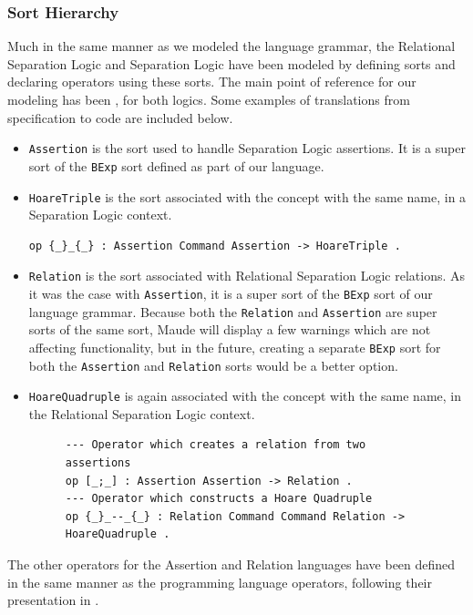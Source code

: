 \documentclass[12pt,a4paper]{article}
\begin{document}
{\subsubsection{Sort Hierarchy}
Much in the same manner as we modeled the language grammar, the Relational Separation Logic \cite{relational} and Separation Logic \cite{SeparationLogic} \cite{primer} have been modeled by defining sorts and declaring operators using these sorts. The main point of reference for our modeling has been \cite{relational}, for both logics. Some examples of translations from specification to code are included below.
\begin{itemize}
	\item \texttt{Assertion} is the sort used to handle Separation Logic assertions. It is a super sort of the \texttt{BExp} sort defined as part of our language.
	\item \texttt{HoareTriple} is the sort associated with the concept with the same name, in a Separation Logic context.
	\begin{lstlisting}[caption=Hoare Triple constructor operator]
op {_}_{_} : Assertion Command Assertion -> HoareTriple .\end{lstlisting}
	\item \texttt{Relation} is the sort associated with Relational Separation Logic relations. As it was the case with \texttt{Assertion}, it is a super sort of the \texttt{BExp} sort of our language grammar. Because both the \texttt{Relation} and \texttt{Assertion} are super sorts of the same sort, Maude will display a few warnings which are not affecting functionality, but in the future, creating a separate \texttt{BExp} sort for both the \texttt{Assertion} and \texttt{Relation} sorts would be a better option.
	\item \texttt{HoareQuadruple} is again associated with the concept with the same name, in the Relational Separation Logic context.
	\begin{figure}[h]
	\begin{lstlisting}[caption=Examples of Relational Separation Logic specific constructs]
--- Operator which creates a relation from two assertions
op [_;_] : Assertion Assertion -> Relation .
--- Operator which constructs a Hoare Quadruple 
op {_}_--_{_} : Relation Command Command Relation -> HoareQuadruple .\end{lstlisting}
	\end{figure}
\end{itemize}
The other operators for the Assertion and Relation languages have been defined in the same manner as the programming language operators, following their presentation in \cite{relational}.

}
\end{document}
